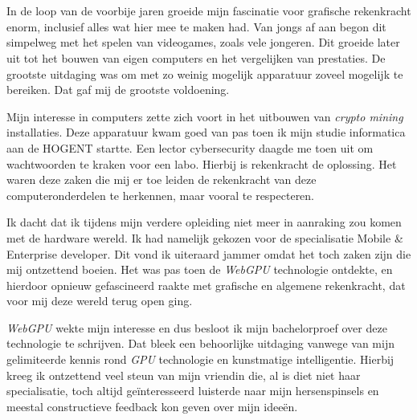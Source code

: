 
\chapter*{}%
\label{ch:voorwoord}


In de loop van de voorbije jaren groeide mijn fascinatie voor grafische rekenkracht enorm, inclusief alles wat hier mee te maken had. Van jongs af aan begon dit simpelweg met het spelen van videogames, zoals vele jongeren. Dit groeide later uit tot het bouwen van eigen computers en het vergelijken van prestaties. De grootste uitdaging was om met zo weinig mogelijk apparatuur zoveel mogelijk te bereiken. Dat gaf mij de grootste voldoening.

\bigbreak{}

Mijn interesse in computers zette zich voort in het uitbouwen van \textit{crypto mining} installaties. Deze apparatuur kwam goed van pas toen ik mijn studie informatica aan de HOGENT startte. Een lector cybersecurity daagde me toen uit om wachtwoorden te kraken voor een labo. Hierbij is rekenkracht de oplossing. Het waren deze zaken die mij er toe leiden de rekenkracht van deze com\-pu\-ter\-on\-der\-de\-len te herkennen, maar vooral te respecteren. 

\bigbreak{}

Ik dacht dat ik tijdens mijn verdere opleiding niet meer in aanraking zou komen met de hardware wereld. Ik had namelijk gekozen voor de specialisatie Mobile \& Enterprise developer. Dit vond ik uiteraard jammer omdat het toch zaken zijn die mij ontzettend boeien. Het was pas toen de \textit{WebGPU} technologie ontdekte, en hierdoor opnieuw gefascineerd raakte met grafische en algemene rekenkracht, dat voor mij deze wereld terug open ging.

\bigbreak{}

\textit{WebGPU} wekte mijn interesse en dus besloot ik mijn bachelorproef over deze technologie te schrijven. Dat bleek een behoorlijke uitdaging vanwege van mijn gelimiteerde kennis rond \textit{GPU} technologie en kunstmatige intelligentie. Hierbij kreeg ik ontzettend veel steun van mijn vriendin die, al is diet niet haar specialisatie, toch altijd geïnteresseerd luisterde naar mijn hersenspinsels en meestal constructieve feedback kon geven over mijn ideeën.

